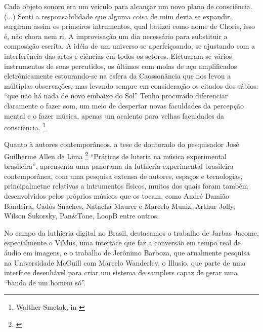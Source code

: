 \begin{citacao}
Cada objeto sonoro era um veículo para alcançar um novo plano de consciência. (...) Senti a responsabilidade que alguma coisa de mim devia se expandir, surgiram assim os primeiros intrumentos, qual batizei como nome de Choris, isso é, não chora nem ri. A improvisação um dia necessário para substituir a composição escrita. A idéia de um universo se aperfeiçoando, se ajustando com a interferência das artes e ciências em todos os setores. Efetuaram-se vários instrumentos de sons percutidos, os últimos com molas de aço amplificados eletrônicamente estourando-se na esfera da Caossonância que nos levou a múltiplas observações, mas levando sempre em consideração os citados dos sábios: ``que não há nada de novo embaixo do Sol''
Tenho procurado diferenciar claramente o fazer som, um meio de despertar novas faculdades da percepção mental e o fazer música, apenas um acalento para velhas faculdades da consciência. \footnote{Walther Smetak, in \cite{JessicaSmetakPaoli2010}}
\end{citacao}

Quanto à autores contemporâneos, a tese de doutorado do pesquisador José Guilherme Allen de Lima \footnote{\cite{Lima2018}} ``Práticas de luteria na música experimental brasileira'', aprensenta uma panorama da luthieria experimental brasileira contemporânea, com uma pesquisa extensa de autores, espaços e tecnologias, principalmetne relativas a intrumentos físicos, muitos dos quais foram também desenvolvidos pelos próprios músicos que os tocam, como André Damião Bandeira, Cadós Snaches, Natacha Maurer e Marcelo Muniz, Arthur Jolly, Wilson Sukorsky, Pan\&Tone, LoopB entre outros.

No campo da luthieria digital no Brasil, destacamos o trabalho de Jarbas Jacome, especialmente o ViMus, uma interface que faz a conversão em tempo real de áudio em imagens, e o trabalho de Jerônimo Barboza, que atualmente pesquisa na Universidade McGuill com Marcelo Wanderley, o Illusio, que parte de uma interface desenhável para criar um sistema de samplers capaz de gerar uma ``banda de um homem só''.  






